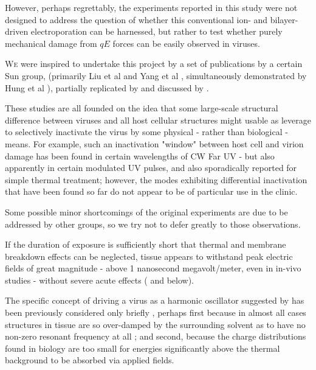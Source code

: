 \documentclass[paper.tex]{subfiles}
\begin{document}
\begin{multicols}{1}
However, perhaps regrettably, the experiments reported in this study were not designed to address the question of whether this conventional ion- and bilayer- driven electroporation can be harnessed, but rather to test whether purely mechanical damage from $qE$ forces can be easily observed in viruses. 

\lettrine{W}e were inspired to undertake this project by a set of publications by a certain Sun group, (primarily Liu et al \cite{Microwave2009} and Yang et al \cite{Efficient2015}, simultaneously demonstrated by Hung et al \cite{focusing2014}), partially replicated by \cite{Optical2020} and discussed by \cite{Theoretical2020}.


These studies are all founded on the idea that some large-scale structural difference between viruses and all host cellular structures might usable as leverage to selectively inactivate the virus by some physical - rather than biological - means. For example, such an inactivation "window" between host cell and virion damage has been found in certain wavelengths of CW Far UV\cite{Germicidal2017} - but also apparently in certain modulated UV pulses\cite{Use1987a}\cite{Can1993}, and also sporadically reported for simple thermal treatment\cite{Summary}; however, the modes exhibiting differential inactivation that have been found so far do not appear to be of particular use in the clinic.

Some possible minor shortcomings of the original experiments are due to be addressed by other groups\cite{Generating}, so we try not to defer greatly to those observations.

If the duration of exposure is sufficiently short that thermal and membrane breakdown effects can be neglected, tissue appears to withstand peak electric fields of great magnitude - above 1 nanosecond megavolt/meter, even in in-vivo studies - without severe acute effects (\cite{Repeated2020}\cite{Review2011}\cite{DNA2004} and below).

The specific concept of driving a virus as a harmonic oscillator suggested by \cite{Efficient2015} has been previously considered only briefly \cite{MECHANICAL1968}\cite{Comment2004}\cite{Vibrational2009}\cite{Maximum2010}\cite{Effects1951}, perhaps first because in almost all cases structures in tissue are so over-damped by the surrounding solvent\cite{Vibrational2002}\cite{Biological2002}\cite{Biophysics2000}\cite{Viscous2000} as to have no non-zero resonant frequency at all \cite{dielectric1996}\cite{gabriel1996compilation}; and second, because the charge distributions found in biology are too small for energies significantly above the thermal background to be absorbed via applied fields. 


\end{multicols}
\end{document}
